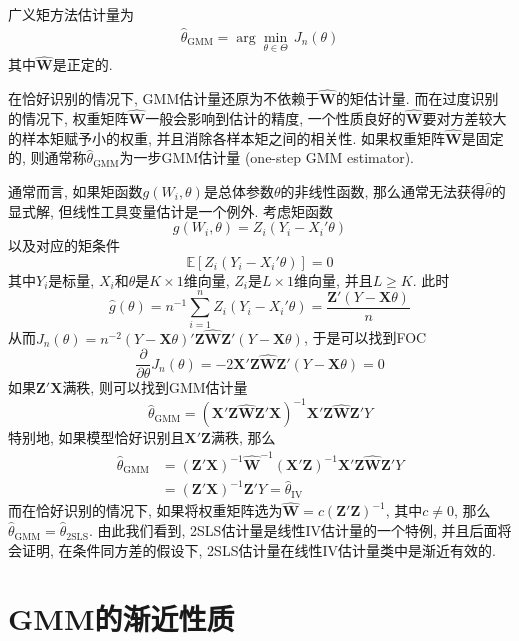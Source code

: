 \documentclass[cn, 12pt, math=mtpro2, bibstyle=apa, blue, twocol]{elegantbook}
\newcommand{\E}{\mathbb{E}}
\newcommand{\W}{\mathbold{W}}
\newcommand{\X}{\mathbold{X}}
\newcommand{\Z}{\mathbold{Z}}
\begin{document}
\begin{definition}\label{def:def7.1}
广义矩方法估计量为
\begin{align*}\hat{\theta}_{\text{GMM}}=\arg\min_{\theta\in \Theta}\, J_n(\theta) \end{align*}
其中$\hat{\W}$是正定的.
\end{definition}
 在恰好识别的情况下, GMM估计量还原为不依赖于$\hat{\W}$的矩估计量. 而在过度识别的情况下, 权重矩阵$\hat{\W}$一般会影响到估计的精度, 一个性质良好的$\hat{\W}$要对方差较大的样本矩赋予小的权重, 并且消除各样本矩之间的相关性. 如果权重矩阵$\hat{\W}$是固定的, 则通常称$\hat{\theta}_{\text{GMM}}$为一步GMM估计量 (one-step GMM estimator).


通常而言, 如果矩函数$g(W_i,\theta)$是总体参数$\theta$的非线性函数, 那么通常无法获得$\hat{\theta}$的显式解, 但线性工具变量估计是一个例外. 考虑矩函数
$$g(W_i,\theta)=Z_i(Y_i-X_i'\theta)$$
以及对应的矩条件
$$\E[Z_i(Y_i-X_i'\theta)]=0$$
其中$Y_i$是标量, $X_i$和$\theta$是$K\times1$维向量, $Z_i$是$L\times1$维向量, 并且$L\geq K$. 此时
$$\hat{g}(\theta)=n^{-1}\sum_{i=1}^{n}Z_i(Y_i-X_i'\theta)=\frac{\Z'(Y-\X\theta)}{n}$$
从而$J_n(\theta)=n^{-2}(Y-\X\theta)'\Z\hat{\W}\Z'(Y-\X\theta)$, 于是可以找到FOC
$$\frac{\partial}{\partial\theta}J_n(\theta)=-2\X'\Z\hat{\W}\Z'(Y-\X\theta)=0$$
如果$\Z'\X$满秩, 则可以找到GMM估计量
$$\hat{\theta}_{\text{GMM}}=(\X'\Z\hat{\W}\Z'\X)^{-1}\X'\Z\hat{\W}\Z'Y$$
特别地, 如果模型恰好识别且$\X'\Z$满秩, 那么
\begin{align*}
\hat{\theta}_{\text{GMM}}&=(\Z'\X)^{-1}\hat{\W}^{-1}(\X'\Z)^{-1}\X'\Z\hat{\W}\Z'Y\\
&=(\Z'\X)^{-1}\Z'Y=\hat{\theta}_{\text{IV}}
\end{align*}
而在恰好识别的情况下, 如果将权重矩阵选为$\hat{\W}=c(\Z'\Z)^{-1}$, 其中$c\neq0$, 那么$\hat{\theta}_{\text{GMM}}=\hat{\theta}_{\text{2SLS}}$. 由此我们看到, 2SLS估计量是线性IV估计量的一个特例, 并且后面将会证明, 在条件同方差的假设下, 2SLS估计量在线性IV估计量类中是渐近有效的.
\section{GMM的渐近性质}
\end{document}
